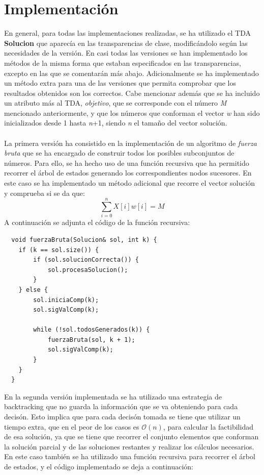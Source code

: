 \documentclass{article}
\begin{document}
  \section{Implementación}
  En general, para todas las implementaciones realizadas, se ha utilizado el TDA \textbf{Solucion} que aparecía en las transparencias de clase, modificándolo según las necesidades de la versión. En casi todas las versiones se han implementado los métodos de la misma forma que estaban especificados en las transparencias, excepto en las que se comentarán más abajo. Adicionalmente se ha implementado un método extra para una de las versiones que permita comprobar que los resultados obtenidos son los correctos. Cabe mencionar además que se ha incluido un atributo más al TDA, \textit{objetivo}, que se corresponde con el número \textit{M} mencionado anteriormente, y que los números que conforman el vector \textit{w} han sido inicializados desde 1 hasta \textit{n}+1, siendo \textit{n} el tamaño del vector solución.\\\\
  La primera versión ha consistido en la implementación de un algoritmo de \textit{fuerza bruta} que se ha encargado de construir todos los posibles subconjuntos de números. Para ello, se ha hecho uso de una función recursiva que ha permitido recorrer el árbol de estados generando los correspondientes nodos sucesores. En este caso se ha implementado un método adicional que recorre el vector solución y comprueba si se da que:
  \[
  \sum_{i=0}^{n}X[i]w[i]=M
  \]
  A continuación se adjunta el código de la función recursiva:
  \begin{lstlisting}
  void fuerzaBruta(Solucion& sol, int k) {
    if (k == sol.size()) {
        if (sol.solucionCorrecta()) {
            sol.procesaSolucion();
        }
    } else {
        sol.iniciaComp(k);
        sol.sigValComp(k);

        while (!sol.todosGenerados(k)) {
            fuerzaBruta(sol, k + 1);
            sol.sigValComp(k);
        }
    }
  }
  \end{lstlisting} 
  En la segunda versión implementada se ha utilizado una estrategia de backtracking que no guarda la información que se va obteniendo para cada decisón. Esto implica que para cada decisón tomada se tiene que utilizar un tiempo extra, que en el peor de los casos es $\mathcal{O}(n)$, para calcular la factibilidad de esa solución, ya que se tiene que recorrer el conjunto elementos que conforman la solución parcial y de las soluciones restantes y realizar los cálculos necesarios. En este caso también se ha utilizado una función recursiva para recorrer el árbol de estados, y el código implementado se deja a continuación:
\end{document}
